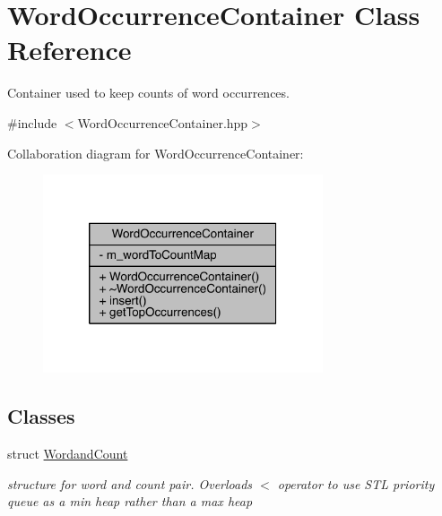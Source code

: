 \hypertarget{class_word_occurrence_container}{}\section{Word\+Occurrence\+Container Class Reference}
\label{class_word_occurrence_container}


Container used to keep counts of word occurrences.  




{\ttfamily \#include $<$Word\+Occurrence\+Container.\+hpp$>$}



Collaboration diagram for Word\+Occurrence\+Container\+:\nopagebreak
\begin{figure}[H]
\begin{center}
\leavevmode
\includegraphics[width=234pt]{class_word_occurrence_container__coll__graph}
\end{center}
\end{figure}
\subsection*{Classes}
\begin{DoxyCompactItemize}
\item 
struct \mbox{\hyperlink{struct_word_occurrence_container_1_1_wordand_count}{Wordand\+Count}}
\begin{DoxyCompactList}\small\item\em structure for word and count pair. Overloads $<$ operator to use S\+TL priority queue as a min heap rather than a max heap \end{DoxyCompactList}\end{DoxyCompactItemize}

